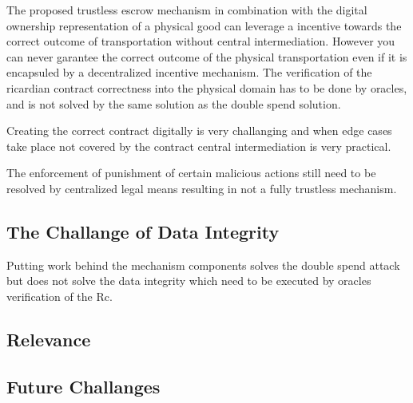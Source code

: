 
The proposed trustless escrow mechanism in combination with the digital ownership representation of a physical good can leverage a incentive towards the correct outcome of transportation without central intermediation. However you can never garantee the correct outcome of the physical transportation even if it is encapsuled by a decentralized incentive mechanism. The verification of the ricardian contract correctness into the physical domain has to be done by oracles, and is not solved by the same solution as the double spend solution.\par

Creating the correct contract digitally is very challanging and when edge cases take place not covered by the contract central intermediation is very practical. \par
The enforcement of punishment of certain malicious actions still need to be resolved by centralized legal means resulting in not a fully trustless mechanism. \par

\subsection{The Challange of Data Integrity}

Putting work behind the mechanism components solves the double spend attack but does not solve the data integrity which need to be executed by oracles verification of the Rc.

\subsection{Relevance}

\subsection{Future Challanges}

